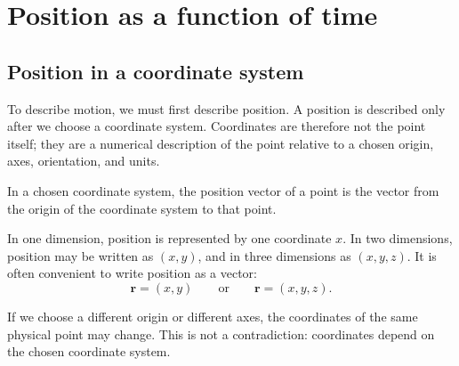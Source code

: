 \section{Position as a function of time}

\subsection{Position in a coordinate system}

To describe motion, we must first describe position. A position is described only after we choose a coordinate system. Coordinates are therefore not the point itself; they are a numerical description of the point relative to a chosen origin, axes, orientation, and units.

\begin{definitionbox}
In a chosen coordinate system, the position vector of a point is the vector from the origin of the coordinate system to that point.
\end{definitionbox}

In one dimension, position is represented by one coordinate \(x\). In two dimensions, position may be written as \((x,y)\), and in three dimensions as \((x,y,z)\). It is often convenient to write position as a vector:
\[
\mathbf{r}=(x,y)
\qquad\text{or}\qquad
\mathbf{r}=(x,y,z).
\]

\begin{center}
\end{center}

\begin{remarkbox}
If we choose a different origin or different axes, the coordinates of the same physical point may change. This is not a contradiction: coordinates depend on the chosen coordinate system.
\end{remarkbox}

